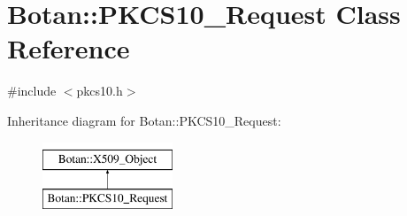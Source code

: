 \hypertarget{classBotan_1_1PKCS10__Request}{\section{Botan\-:\-:P\-K\-C\-S10\-\_\-\-Request Class Reference}
\label{classBotan_1_1PKCS10__Request}
}


{\ttfamily \#include $<$pkcs10.\-h$>$}

Inheritance diagram for Botan\-:\-:P\-K\-C\-S10\-\_\-\-Request\-:\begin{figure}[H]
\begin{center}
\leavevmode
\includegraphics[height=2.000000cm]{classBotan_1_1PKCS10__Request}
\end{center}
\end{figure}
